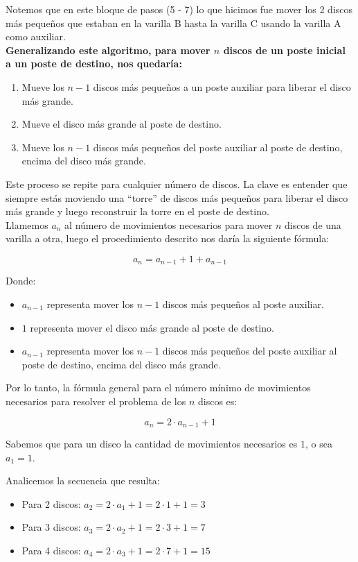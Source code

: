 Notemos que en este bloque de pasos (5 - 7) lo que hicimos fue mover los 2 discos más pequeños que estaban en la varilla B hasta la varilla C usando la varilla A como auxiliar.\\

\textbf{Generalizando este algoritmo, para mover $n$ discos de un poste inicial a un poste de destino, nos quedaría:}
\begin{enumerate}
    \item Mueve los $n - 1$ discos más pequeños a un poste auxiliar para liberar el disco más grande.
    \item Mueve el disco más grande al poste de destino.
    \item Mueve los $n - 1$ discos más pequeños del poste auxiliar al poste de destino, encima del disco más grande.
\end{enumerate}

Este proceso se repite para cualquier número de discos. La clave es entender que siempre estás moviendo una “torre” de discos más pequeños para liberar el disco más grande y luego reconstruir la torre en el poste de destino.\\

Llamemos $a_{n}$ al número de movimientos necesarios para mover $n$ discos de una varilla a otra, luego el procedimiento descrito nos daría la siguiente fórmula:

\[
a_{n} = a_{n - 1} + 1 + a_{n - 1}
\]

Donde:
\begin{itemize}
    \item $a_{n - 1}$ representa mover los $n - 1$ discos más pequeños al poste auxiliar.
    \item $1$ representa mover el disco más grande al poste de destino.
    \item $a_{n - 1}$ representa mover los $n - 1$ discos más pequeños del poste auxiliar al poste de destino, encima del disco más grande.
\end{itemize}

Por lo tanto, la fórmula general para el número mínimo de movimientos necesarios para resolver el problema de los $n$ discos es:

\[
a_{n } = 2 \cdot a_{n - 1} + 1
\]

Sabemos que para un disco la cantidad de movimientos necesarios es $1$, o sea $a_1 = 1$. 

Analicemos la secuencia que resulta:

\begin{itemize}
    \item Para 2 discos: $a_2 = 2 \cdot a_1 + 1 = 2 \cdot 1 + 1 = 3$
    \item Para 3 discos: $a_3 = 2 \cdot a_2 + 1 = 2 \cdot 3 + 1 = 7$
    \item Para 4 discos: $a_4 = 2 \cdot a_3 + 1 = 2 \cdot 7 + 1 = 15$
\end{itemize}

